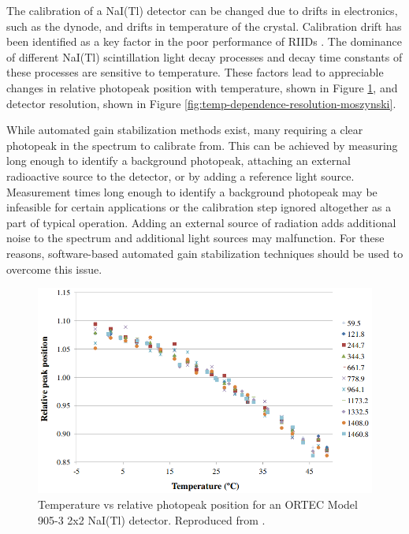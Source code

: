 
The calibration of a NaI(Tl) detector can be changed due to drifts in electronics, such as the dynode, and drifts in temperature of the crystal. Calibration drift has been identified as a key factor in the poor performance of RIIDs \cite{blackadar2003}. The dominance of different NaI(Tl) scintillation light decay processes \cite{IANAKIEV2009432} and decay time constants of these processes\cite{MOSZYNSKI2006739} are sensitive to temperature. These factors lead to appreciable changes in relative photopeak position with temperature, shown in Figure \ref{fig:CASANOVAS2012588}, and detector resolution, shown in Figure \ref{fig:temp-dependence-resolution-moszynski}. 

While automated gain stabilization methods exist, many requiring a clear photopeak in the spectrum to calibrate from. This can be achieved by measuring long enough to identify a background photopeak, attaching an external radioactive source to the detector, or by adding a reference light source. Measurement times long enough to identify a background photopeak may be infeasible for certain applications or the calibration step ignored altogether as a part of typical operation. Adding an external source of radiation adds additional noise to the spectrum and additional light sources may malfunction. For these reasons, software-based automated gain stabilization techniques should be used to overcome this issue.

\begin{figure}[H]
\centering
\includegraphics[width=0.95\linewidth]{images/temp_vs_relative_peak_position_CASANOVAS2012588}
\caption{Temperature vs relative photopeak position for an ORTEC Model 905-3 2x2 NaI(Tl) detector.  Reproduced from \cite{CASANOVAS2012588}.}
\label{fig:CASANOVAS2012588}
\end{figure}




